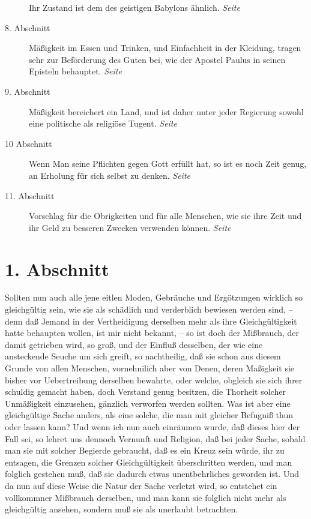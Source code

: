 \begin{description}
Ihr Zustand ist dem des geistigen Babylons ähnlich.
\dotfill \textit{Seite \pageref{kap18_ab7}}\\
\item[8. Abschnitt] Mäßigkeit im Essen und Trinken, und Einfachheit in der
Kleidung, tragen sehr zur Beförderung des Guten bei, wie der Apostel Paulus in
seinen Episteln behauptet.
\dotfill \textit{Seite \pageref{kap18_ab8}}\\
\item[9. Abschnitt] Mäßigkeit bereichert ein Land, und ist daher unter jeder
Regierung sowohl eine politische als religiöse Tugent.
\dotfill \textit{Seite \pageref{kap18_ab9}}\\
\item[10 Abschnitt] Wenn Man seine Pflichten gegen Gott erfüllt hat, so ist es
noch Zeit genug, an Erholung für sich selbst zu denken.
\dotfill \textit{Seite \pageref{kap18_ab10}}\\
\item[11. Abschnitt] Vorschlag für die Obrigkeiten und für alle Menschen, wie
sie ihre Zeit und ihr Geld zu besseren Zwecken verwenden können.
\dotfill \textit{Seite \pageref{kap18_ab11}}\\

\end{description}

\newpage

\section{1. Abschnitt} \label{kap18_ab1}

Sollten nun auch alle jene eitlen Moden, Gebräuche und Ergötzungen wirklich so
gleichgültig sein, wie sie als schädlich und verderblich bewiesen werden sind,
-- denn daß Jemand in der Vertheidigung derselben mehr als ihre Gleichgültigkeit
hatte behaupten wollen, ist mir nicht bekannt, -- so ist doch der Mißbrauch, der
damit getrieben wird, so groß, und der Einfluß desselben, der wie eine
ansteckende Seuche um sich greift, so nachtheilig, daß sie schon aus diesem
Grunde von allen Menschen, vornehnilich aber von Denen, deren Maßigkeit sie
bisher vor Uebertreibung derselben bewahrte, oder welche, obgleich sie sich
ihrer schuldig gemacht haben, doch Verstand genug besitzen, die Thorheit solcher
Unmäßigkeit einzusehen, gänzlich verworfen werden sollten. Was ist aber eine
gleichgültige Sache anders, als eine solche, die man mit gleicher Befugniß thun
oder lassen kann? Und wenn ich nun auch einräumen wurde, daß dieses hier der
Fall sei, so lehret uns dennoch Vernunft und Religion, daß bei jeder Sache,
sobald man sie mit solcher Begierde gebraucht, daß es ein Kreuz
sein würde, ihr
zu entsagen, die Grenzen solcher Gleichgültigkeit überschritten werden, und man
folglich gestehen muß, daß sie dadurch etwas unentbehrliches geworden ist. Und
da nun auf diese Weise die Natur der Sache verletzt wird, so entstehet ein
vollkommner Mißbrauch derselben, und man kann sie folglich nicht mehr als
gleichgültig ansehen, sondern muß sie als unerlaubt betrachten.

